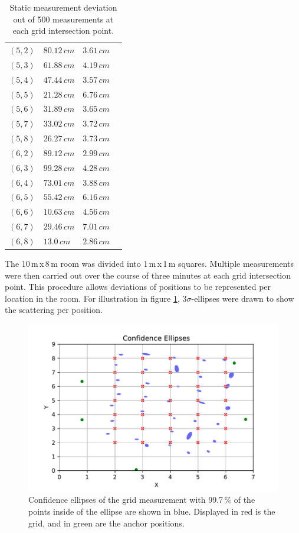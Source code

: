 \documentclass[conference, a4paper]{IEEEtran}
\begin{document}
\begin{table}[hbt!]
\begin{tabular}{l l l c}
		$(5,2)$ & $80.12\,cm$ & $3.61\,cm$\\
		$(5,3)$ & $61.88\,cm$ & $4.19\,cm$\\
		$(5,4)$ & $47.44\,cm$ & $3.57\,cm$\\
		$(5,5)$ & $21.28\,cm$ & $6.76\,cm$\\
		$(5,6)$ & $31.89\,cm$ & $3.65\,cm$\\
		$(5,7)$ & $33.02\,cm$ & $3.72\,cm$\\
		$(5,8)$ & $26.27\,cm$ & $3.73\,cm$\\
		
		$(6,2)$ & $89.12\,cm$ & $2.99\,cm$\\
		$(6,3)$ & $99.28\,cm$ & $4.28\,cm$\\
		$(6,4)$ & $73.01\,cm$ & $3.88\,cm$\\
		$(6,5)$ & $55.42\,cm$ & $6.16\,cm$\\
		$(6,6)$ & $10.63\,cm$ & $4.56\,cm$\\
		$(6,7)$ & $29.46\,cm$ & $7.01\,cm$\\
		$(6,8)$ & $13.0\,cm$ & $2.86\,cm$\\
		
	\end{tabular}
	\caption{Static measurement deviation out of 500 measurements at each grid intersection point.}
	\label{table:measurements}
\end{table}

The 10\,m\,x\,8\,m room was divided into 1\,m\,x\,1\,m squares. 
Multiple measurements were then carried out over the course of three minutes at each grid intersection point.
This procedure allows deviations of positions to be represented per location in the room.
For illustration in figure \ref{fig:statistics}, $3\sigma$-ellipses were drawn to show the scattering per position.

\begin{figure}[hbt!]
	\includegraphics[scale=0.63]{pic/position_plot.pdf}
	\caption{Confidence ellipses of the grid measurement with 99.7\,\% of the points inside of the ellipse are shown in blue.
	Displayed in red is the grid, and in green are the anchor positions.}
	\label{fig:statistics}
\end{figure}
\end{document}
